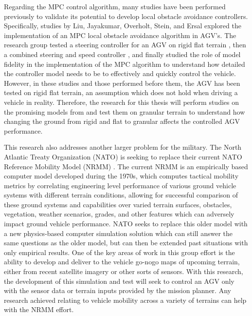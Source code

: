 \documentclass[12pt,onecolumn]{report}
\begin{document}
Regarding the MPC control algorithm, many studies have been performed previously to validate its potential to develop local obstacle avoidance controllers. Specifically, studies by Liu, Jayakumar, Overholt, Stein, and Ersal explored the implementation of an MPC local obstacle avoidance algorithm in AGV’s. The research group tested a steering controller for an AGV on rigid flat terrain \cite{ModelFidelity2013}, then a combined steering and speed controller \cite{SpeedSteer2015}, and finally studied the role of model fidelity in the implementation of the MPC algorithm \cite{ModelFidelity2016} to understand how detailed the controller model needs to be to effectively and quickly control the vehicle. However, in these studies and those performed before them, the AGV has been tested on rigid flat terrain, an assumption which does not hold when driving a vehicle in reality. Therefore, the research for this thesis will perform  studies on the promising models from \cite{ModelFidelity2016} and test them on granular terrain to understand how changing the ground from rigid and flat to granular affects the controlled AGV performance.

This research also addresses another larger problem for the military. The North Atlantic Treaty Organization (NATO) is seeking to replace their current NATO Reference Mobility Model (NRMM) \cite{NATONRMM}. The current NRMM is an empirically based computer model developed during the 1970s, which computes tactical mobility metrics by correlating engineering level performance of various ground vehicle systems with different terrain conditions, allowing for successful comparison of these ground systems and capabilities over varied terrain surfaces, obstacles, vegetation, weather scenarios, grades, and other features which can adversely impact ground vehicle performance. NATO seeks to replace this older model with a new physics-based computer simulation solution which can still answer the same questions as the older model, but can then be extended past situations with only empirical results. One of the key areas of work in this group effort is the ability to develop and deliver to the vehicle go-nogo maps of upcoming terrain, either from recent satellite imagery or other sorts of sensors. With this research, the development of this simulation and test will seek to control an AGV only with the sensor data or terrain inputs provided by the mission planner. Any research achieved relating to vehicle mobility across a variety of terrains can help with the NRMM effort. 
\end{document}
